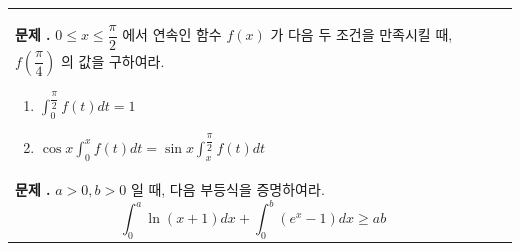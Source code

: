 \documentclass[10pt, a4paper]{article}
\newcounter{probcount}
\newcommand{\exercise}[1]{%
    \stepcounter{probcount}%
    \begin{minipage}[t][120mm][t]{0.44\textwidth}
        \small 
        \vspace{1mm}
        \noindent \textbf{문제 \arabic{probcount}.} #1
    \end{minipage}%
}
\begin{document}
\begin{longtable}{p{} | p{}}
    \exercise{$0 \le x \le \dfrac{\pi}{2}$ 에서 연속인 함수 $f(x)$ 가 다음 두 조건을 만족시킬 때, $f(\dfrac{\pi}{4})$ 의 값을 구하여라.
    \begin{enumerate}[label=(\roman*), nosep]
        \item $\displaystyle \int_0^{\dfrac{\pi}{2}} f(t) dt = 1$
        \item $\cos x \displaystyle \int_0^x f(t) dt = \sin x \int_x^{\dfrac{\pi}{2}} f(t) dt$
    \end{enumerate}} \\
    
    \exercise{$a>0, b>0$ 일 때, 다음 부등식을 증명하여라.
    \[ \int_0^a \ln(x+1) dx + \int_0^b (e^x-1) dx \ge ab \]} 
    &

\end{longtable}
\end{document}

